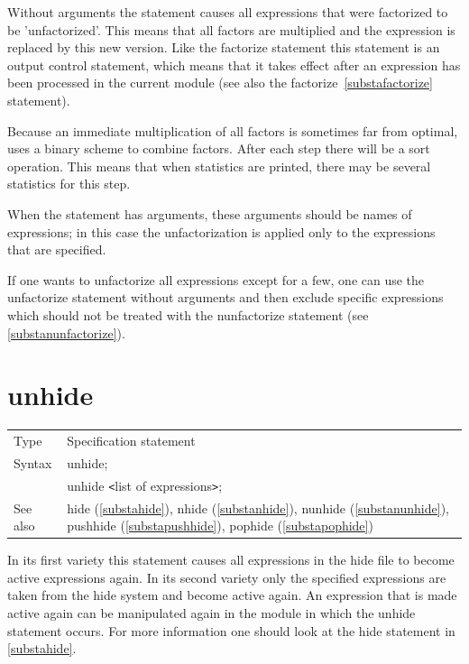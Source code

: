 \noindent Without arguments the statement causes all expressions that were 
factorized to be 'unfactorized'. This means that all factors are multiplied 
and the expression is replaced by this new version. Like the factorize 
statement this statement is an output control statement, which means that 
it takes effect after an expression has been processed in the current 
module (see also the factorize~\ref{substafactorize} statement).

\noindent Because an immediate multiplication of all factors is sometimes 
far from optimal, \FORM{} uses a binary scheme to combine factors. After each 
step there will be a sort operation. This means that when statistics are 
printed, there may be several statistics for this step.

\noindent When the statement has arguments, these arguments should be names 
of expressions; in this case the unfactorization is applied only to the 
expressions that are specified.

\noindent If one wants to unfactorize all expressions except for a few,
one can use the unfactorize statement without arguments and then 
exclude specific expressions which should not be treated with the 
nunfactorize statement (see \ref{substanunfactorize}).
\vspace{10mm} 


\section{unhide}
\label{substaunhide}

\noindent \begin{tabular}{ll}
Type & Specification statement\\
Syntax & unhide; \\
       & unhide {\tt<}list of expressions{\tt>};
\\ See also & hide (\ref{substahide}),
              nhide (\ref{substanhide}),
              nunhide (\ref{substanunhide}),
              pushhide (\ref{substapushhide}),
              pophide (\ref{substapophide})
\end{tabular} \vspace{4mm}

\noindent In its first variety this statement causes all 
expressions in the hide file to become 
active expressions again. In its second variety only the 
specified expressions are taken from the hide system and become active 
again. An expression that is made active again can be manipulated again in 
the module in which the unhide statement occurs. For more information one 
should look at the hide statement in \ref{substahide}. \vspace{4mm}

